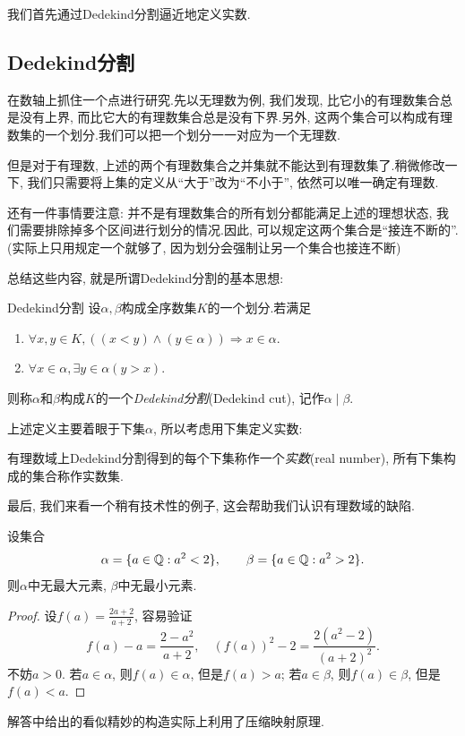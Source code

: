 我们首先通过Dedekind分割逼近地定义实数.

\subsection{Dedekind分割}

在数轴上抓住一个点进行研究.先以无理数为例, 我们发现, 比它小的有理数集合总是没有上界, 而比它大的有理数集合总是没有下界.另外, 这两个集合可以构成有理数集的一个划分.我们可以把一个划分一一对应为一个无理数.

但是对于有理数, 上述的两个有理数集合之并集就不能达到有理数集了.稍微修改一下, 我们只需要将上集的定义从“大于”改为“不小于”, 依然可以唯一确定有理数.

还有一件事情要注意: 并不是有理数集合的所有划分都能满足上述的理想状态, 我们需要排除掉多个区间进行划分的情况.因此, 可以规定这两个集合是“接连不断的”. (实际上只用规定一个就够了, 因为划分会强制让另一个集合也接连不断)

总结这些内容, 就是所谓Dedekind分割的基本思想: 

\begin{definition}{Dedekind分割}
	设$\alpha , \beta$构成全序数集$K$的一个划分.若满足
	\begin{enumerate}
		\item $\forall x, y \in K, ((x < y) \wedge (y \in \alpha)) \Rightarrow x \in \alpha$.
		\item $\forall x \in \alpha , \exists y \in \alpha (y>x)$.
	\end{enumerate}
	则称$\alpha$和$\beta$构成$K$的一个\textit{Dedekind分割}(Dedekind cut), 记作$\alpha \mid \beta$. 
\end{definition}

上述定义主要着眼于下集$\alpha$, 所以考虑用下集定义实数: 

\begin{definition}{}
	有理数域上Dedekind分割得到的每个下集称作一个\textit{实数}(real number), 所有下集构成的集合称作实数集.
\end{definition}

最后, 我们来看一个稍有技术性的例子, 这会帮助我们认识有理数域的缺陷. 

\begin{example}
	设集合$$\alpha = \{ a \in \mathbb{Q} :a^2 < 2 \},\qquad \beta = \{ a \in \mathbb{Q} :a^2>2 \}. $$
	则$\alpha$中无最大元素, $\beta$中无最小元素. 
\end{example}
\begin{proof}
	设$f(a)=\frac{2a+2}{a+2}$, 容易验证$$f(a)-a = \frac{2-a^2}{a+2},\quad (f(a))^2-2 = \frac{2(a^2-2)}{(a+2)^2}. $$
	不妨$a>0$. 若$a \in \alpha$, 则$f(a) \in \alpha$, 但是$f(a) > a$; 若$a \in \beta$, 则$f(a) \in \beta$, 但是$f(a) < a$. 
\end{proof}
\begin{remark}
	解答中给出的看似精妙的构造实际上利用了压缩映射原理. 
\end{remark}

